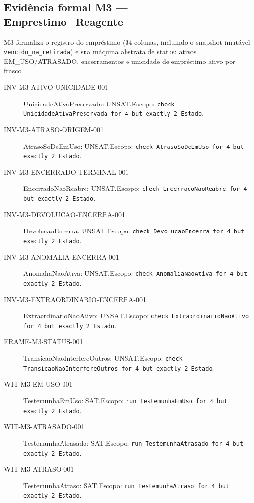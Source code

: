 \subsection*{Evidência formal M3 --- Emprestimo\_Reagente}
M3 formaliza o registro do empréstimo (34 colunas, incluindo o snapshot imutável \texttt{vencido\_na\_retirada}) e sua máquina abstrata de status: ativos EM\_USO/ATRASADO, encerramentos e unicidade de empréstimo ativo por frasco.
\begin{description}
\item[INV-M3-ATIVO-UNICIDADE-001] UnicidadeAtivaPreservada: UNSAT.\newline Escopo: \texttt{check UnicidadeAtivaPreservada for 4 but exactly 2 Estado}.
\item[INV-M3-ATRASO-ORIGEM-001] AtrasoSoDeEmUso: UNSAT.\newline Escopo: \texttt{check AtrasoSoDeEmUso for 4 but exactly 2 Estado}.
\item[INV-M3-ENCERRADO-TERMINAL-001] EncerradoNaoReabre: UNSAT.\newline Escopo: \texttt{check EncerradoNaoReabre for 4 but exactly 2 Estado}.
\item[INV-M3-DEVOLUCAO-ENCERRA-001] DevolucaoEncerra: UNSAT.\newline Escopo: \texttt{check DevolucaoEncerra for 4 but exactly 2 Estado}.
\item[INV-M3-ANOMALIA-ENCERRA-001] AnomaliaNaoAtiva: UNSAT.\newline Escopo: \texttt{check AnomaliaNaoAtiva for 4 but exactly 2 Estado}.
\item[INV-M3-EXTRAORDINARIO-ENCERRA-001] ExtraordinarioNaoAtivo: UNSAT.\newline Escopo: \texttt{check ExtraordinarioNaoAtivo for 4 but exactly 2 Estado}.
\item[FRAME-M3-STATUS-001] TransicaoNaoInterfereOutros: UNSAT.\newline Escopo: \texttt{check TransicaoNaoInterfereOutros for 4 but exactly 2 Estado}.
\item[WIT-M3-EM-USO-001] TestemunhaEmUso: SAT.\newline Escopo: \texttt{run TestemunhaEmUso for 4 but exactly 2 Estado}.
\item[WIT-M3-ATRASADO-001] TestemunhaAtrasado: SAT.\newline Escopo: \texttt{run TestemunhaAtrasado for 4 but exactly 2 Estado}.
\item[WIT-M3-ATRASO-001] TestemunhaAtraso: SAT.\newline Escopo: \texttt{run TestemunhaAtraso for 4 but exactly 2 Estado}.

\end{description}
